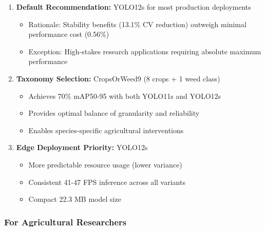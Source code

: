 \begin{enumerate}
    \item \textbf{Default Recommendation:} YOLO12s for most production deployments
    \begin{itemize}
        \item Rationale: Stability benefits (13.1\% CV reduction) outweigh minimal performance cost (0.56\%)
        \item Exception: High-stakes research applications requiring absolute maximum performance
    \end{itemize}
    
    \item \textbf{Taxonomy Selection:} CropsOrWeed9 (8 crops + 1 weed class)
    \begin{itemize}
        \item Achieves 70\% mAP50-95 with both YOLO11s and YOLO12s
        \item Provides optimal balance of granularity and reliability
        \item Enables species-specific agricultural interventions
    \end{itemize}
    
    \item \textbf{Edge Deployment Priority:} YOLO12s
    \begin{itemize}
        \item More predictable resource usage (lower variance)
        \item Consistent 41-47 FPS inference across all variants
        \item Compact 22.3 MB model size
    \end{itemize}
\end{enumerate}

\subsubsection{For Agricultural Researchers}


